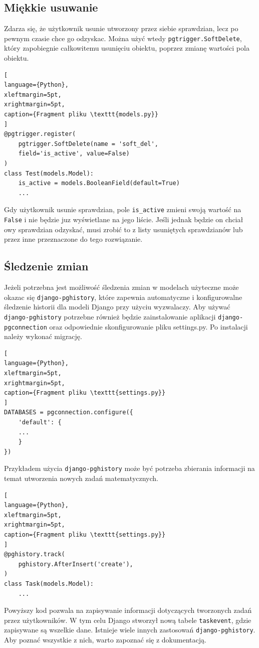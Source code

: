 \documentclass[oneside,polski,logo,indent]{amuthesis}
\begin{document}
\begin{center}
\subsection{Miękkie usuwanie}
\end{center}
Zdarza się, że użytkownik usunie utworzony przez siebie sprawdzian, lecz po pewnym czasie chce go odzyskac. Można użyć wtedy \texttt{pgtrigger.SoftDelete}, który zapobiegnie całkowitemu usunięciu obiektu, poprzez zmianę wartości pola obiektu.
\begin{lstlisting}[
language={Python},
xleftmargin=5pt,
xrightmargin=5pt,
caption={Fragment pliku \texttt{models.py}}
]
@pgtrigger.register(
    pgtrigger.SoftDelete(name = 'soft_del',
	field='is_active', value=False)
)
class Test(models.Model):
    is_active = models.BooleanField(default=True)
    ... 
\end{lstlisting}
Gdy użytkownik usunie sprawdzian, pole \texttt{is\_active} zmieni swoją wartość na \texttt{False} i nie będzie juz wyświetlane na jego liście. Jeśli jednak będzie on chciał owy sprawdzian odzyskać, musi zrobić to z listy usuniętych sprawdzianów lub przez inne przeznaczone do tego rozwiązanie.
\begin{center}
\subsection{Śledzenie zmian}
\end{center}

Jeżeli potrzebna jest możliwość śledzenia zmian w modelach użyteczne może okazac się \texttt{django-pghistory}, które zapewnia automatyczne i konfigurowalne śledzenie historii dla modeli Django przy użyciu wyzwalaczy. Aby używać \texttt{django-pghistory} potrzebne również będzie zainstalowanie aplikacji \texttt{django-pgconnection} oraz odpowiednie skonfigurowanie pliku settings.py. Po instalacji należy wykonać migrację.
\begin{lstlisting}[
language={Python},
xleftmargin=5pt,
xrightmargin=5pt,
caption={Fragment pliku \texttt{settings.py}}
]
DATABASES = pgconnection.configure({
    'default': {
	...
    }
})
\end{lstlisting}
Przykładem użycia \texttt{django-pghistory} może być potrzeba zbierania informacji na temat utworzenia nowych zadań matematycznych.
\begin{lstlisting}[
language={Python},
xleftmargin=5pt,
xrightmargin=5pt,
caption={Fragment pliku \texttt{settings.py}}
]
@pghistory.track(
    pghistory.AfterInsert('create'),
)
class Task(models.Model):
	...
\end{lstlisting}
Powyższy kod pozwala na zapisywanie informacji dotyczących tworzonych zadań przez użytkowników. W tym celu Django stworzył nową tabele \texttt{taskevent}, gdzie zapisywane są wszelkie dane.
Istnieje wiele innych zastosowań \texttt{django-pghistory}. Aby poznać wszystkie z nich, warto zapoznać się z dokumentacją.
\end{document}
